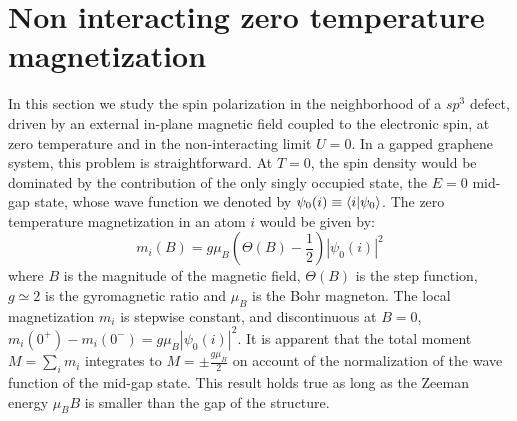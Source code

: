 \section{Non interacting zero temperature magnetization}
\label{sec:Phys}
In this section we study the spin polarization in the neighborhood of a $sp^3$ defect, driven by an external in-plane magnetic field coupled to the electronic spin, at zero temperature and in the non-interacting limit $U=0$.
In a gapped graphene system, this problem is straightforward. At $T=0$,  the
spin density would be dominated by the contribution of the only singly occupied
state, the $E=0$ mid-gap state, whose wave function we denoted by $\psi_0(i)\equiv \langle i|\psi_0\rangle$.
The zero temperature magnetization in an atom $i$ would be given by:
\begin{equation}
m_i(B) = g\mu_B \left(\Theta(B)-\frac{1}{2}\right) |\psi_0(i)|^2
\end{equation}
where $B$ is the magnitude of the magnetic field, $\Theta(B)$ is the step function, $g\simeq2$ is the gyromagnetic ratio and $\mu_B$ is the Bohr magneton. The local magnetization $m_i$ is stepwise constant, and discontinuous at $B=0$, $m_i(0^+)-m_i(0^-)= g\mu_B |\psi_0(i)|^2$.
It is apparent that the total moment $M=\sum_i m_i$ integrates to $M=\pm \frac{g\mu_B}{2}$ on account of the normalization of the wave function of the mid-gap state. This result holds true as long as the Zeeman energy $\mu_B B$  is smaller than the gap of the structure.


